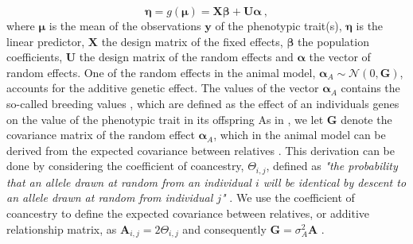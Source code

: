 \begin{equation}
    \boldsymbol{\eta} = g(\boldsymbol{\mu}) = \mathbf{X}\boldsymbol{\beta} + \mathbf{U}\boldsymbol{\alpha}\ ,
\end{equation}
where $\boldsymbol{\mu}$ is the mean of the observations $\mathbf{y}$ of the phenotypic trait(s), $\boldsymbol{\eta}$ is the linear predictor, $\mathbf{X}$ the design matrix of the fixed effects, $\boldsymbol{\beta}$ the population coefficients, $\mathbf{U}$ the design matrix of the random effects and $\boldsymbol{\alpha}$ the vector of random effects.
One of the random effects in the animal model, $\boldsymbol{\alpha}_A \sim \mathcal{N}(0, \mathbf{G})$,  accounts for the additive genetic effect. The values of the vector $\boldsymbol{\alpha}_A$ contains the so-called breeding values \citet{Wilson_guide_animal_model}, which are defined as the effect of an individuals genes on the value of the phenotypic trait in its offspring \citep{ConnerHartl2004} 
As in , we let $\mathbf{G}$ denote the covariance matrix of the random effect $\boldsymbol{\alpha}_A$, which in the animal model can be derived from the expected covariance between relatives \citep{Kruuk2004}.
This derivation can be done by considering the coefficient of coancestry, $\Theta_{i,j}$, defined as \textit{"the probability that an allele drawn at random from an individual $i$ will be identical by descent to an allele drawn at random from individual $j$"} \citep{Kruuk2004}. 
We use the coefficient of coancestry to define the expected covariance between relatives, or additive relationship matrix, as $\mathbf{A}_{i, j}=2\Theta_{i, j}$ and consequently $\mathbf{G}=\sigma^2_A\mathbf{A}$ \citep{Kruuk2004}. 
